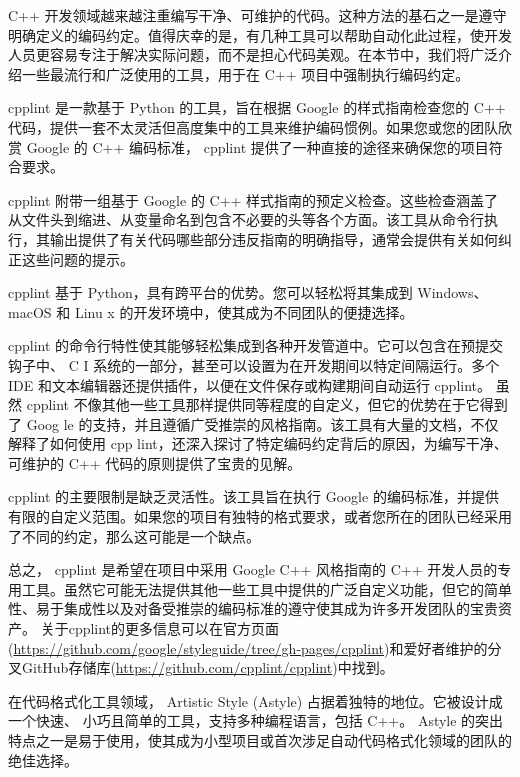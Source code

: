 
C++ 开发领域越来越注重编写干净、可维护的代码。这种方法的基石之一是遵守明确定义的编码约定。值得庆幸的是，有几种工具可以帮助自动化此过程，使开发人员更容易专注于解决实际问题，而不是担心代码美观。在本节中，我们将广泛介绍一些最流行和广泛使用的工具，用于在 C++ 项目中强制执行编码约定。


cpplint 是一款基于 Python 的工具，旨在根据 Google 的样式指南检查您的 C++ 代码，提供一套不太灵活但高度集中的工具来维护编码惯例。如果您或您的团队欣赏 Google 的 C++ 编码标准， cpplint 提供了一种直接的途径来确保您的项目符合要求。

cpplint 附带一组基于 Google 的 C++ 样式指南的预定义检查。这些检查涵盖了从文件头到缩进、从变量命名到包含不必要的头等各个方面。该工具从命令行执行，其输出提供了有关代码哪些部分违反指南的明确指导，通常会提供有关如何纠正这些问题的提示。

cpplint 基于 Python，具有跨平台的优势。您可以轻松将其集成到 Windows、 macOS 和 Linu x 的开发环境中，使其成为不同团队的便捷选择。

cpplint 的命令行特性使其能够轻松集成到各种开发管道中。它可以包含在预提交钩子中、 C I 系统的一部分，甚至可以设置为在开发期间以特定间隔运行。多个 IDE 和文本编辑器还提供插件，以便在文件保存或构建期间自动运行 cpplint。
虽然 cpplint 不像其他一些工具那样提供同等程度的自定义，但它的优势在于它得到了 Goog le 的支持，并且遵循广受推崇的风格指南。该工具有大量的文档，不仅解释了如何使用 cpp lint，还深入探讨了特定编码约定背后的原因，为编写干净、可维护的 C++ 代码的原则提供了宝贵的见解。

cpplint 的主要限制是缺乏灵活性。该工具旨在执行 Google 的编码标准，并提供有限的自定义范围。如果您的项目有独特的格式要求，或者您所在的团队已经采用了不同的约定，那么这可能是一个缺点。

总之， cpplint 是希望在项目中采用 Google C++ 风格指南的 C++ 开发人员的专用工具。虽然它可能无法提供其他一些工具中提供的广泛自定义功能，但它的简单性、易于集成性以及对备受推崇的编码标准的遵守使其成为许多开发团队的宝贵资产。
关于cpplint的更多信息可以在官方页面(\url{https://github.com/google/styleguide/tree/gh-pages/cpplint})和爱好者维护的分叉GitHub存储库(\url{https://github.com/cpplint/cpplint})中找到。


在代码格式化工具领域， Artistic Style (Astyle) 占据着独特的地位。它被设计成一个快速、 小巧且简单的工具，支持多种编程语言，包括 C++。 Astyle 的突出特点之一是易于使用，使其成为小型项目或首次涉足自动代码格式化领域的团队的绝佳选择。

